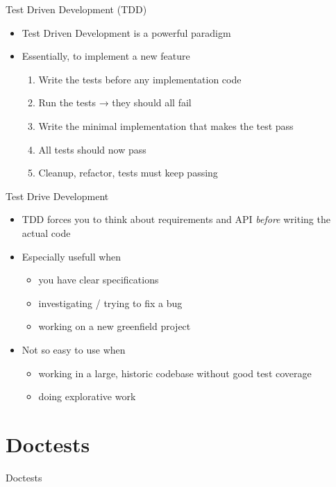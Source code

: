\documentclass[
  aspectratio=1610,
]{beamer}
\newcommand\headlineframe[1]{%
  \begin{frame}[c]%
    \begin{center}%
      \Huge\color{vertexDarkRed}#1%
    \end{center}%
  \end{frame}%
}%
\begin{document}
\begin{frame}[c]{Test Driven Development (TDD)}
  \begin{itemize}
    \item Test Driven Development is a powerful paradigm
    \item Essentially, to implement a new feature
      \begin{enumerate}
        \item Write the tests before any implementation code
        \item Run the tests → they should all fail
        \item Write the minimal implementation that makes the test pass
        \item All tests should now pass
        \item Cleanup, refactor, tests must keep passing
      \end{enumerate}
  \end{itemize}
\end{frame}

\begin{frame}[c]{Test Drive Development}
  \begin{itemize}
    \item TDD forces you to think about requirements and API \emph{before} writing the actual code
    \item Especially usefull when
      \begin{itemize}
        \item you have clear specifications
        \item investigating / trying to fix a bug
        \item working on a new greenfield project
      \end{itemize}
    \item Not so easy to use when
      \begin{itemize}
        \item working in a large, historic codebase without good test coverage
        \item doing explorative work
      \end{itemize}
  \end{itemize}
\end{frame}

\section{Doctests}
\headlineframe{Doctests}
\end{document}
